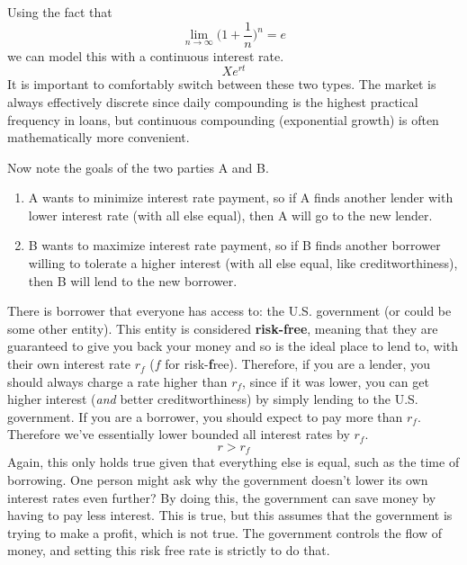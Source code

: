 \documentclass{article}
\begin{document}
    Using the fact that 
    \begin{equation}
      \lim_{n \rightarrow \infty} \bigg( 1 + \frac{1}{n}\bigg)^n = e
    \end{equation}
    we can model this with a continuous interest rate. 
    \begin{equation}
      X e^{rt}
    \end{equation}
    It is important to comfortably switch between these two types. The market is always effectively discrete since daily compounding is the highest practical frequency in loans, but continuous compounding (exponential growth) is often mathematically more convenient. 

    Now note the goals of the two parties A and B. 
    \begin{enumerate}
      \item A wants to minimize interest rate payment, so if A finds another lender with lower interest rate (with all else equal), then A will go to the new lender. 
      \item B wants to maximize interest rate payment, so if B finds another borrower willing to tolerate a higher interest (with all else equal, like creditworthiness), then B will lend to the new borrower. 
    \end{enumerate}

    There is borrower that everyone has access to: the U.S. government (or could be some other entity). This entity is considered \textbf{risk-free}, meaning that they are guaranteed to give you back your money and so is the ideal place to lend to, with their own interest rate $r_f$ ($f$ for risk-\textbf{f}ree). Therefore, if you are a lender, you should always charge a rate higher than $r_f$, since if it was lower, you can get higher interest (\textit{and} better creditworthiness) by simply lending to the U.S. government. If you are a borrower, you should expect to pay more than $r_f$. Therefore we've essentially lower bounded all interest rates by $r_f$. 
    \begin{equation}
      r > r_f
    \end{equation}
    Again, this only holds true given that everything else is equal, such as the time of borrowing. One person might ask why the government doesn't lower its own interest rates even further? By doing this, the government can save money by having to pay less interest. This is true, but this assumes that the government is trying to make a profit, which is not true. The government controls the flow of money, and setting this risk free rate is strictly to do that. 
\end{document}
